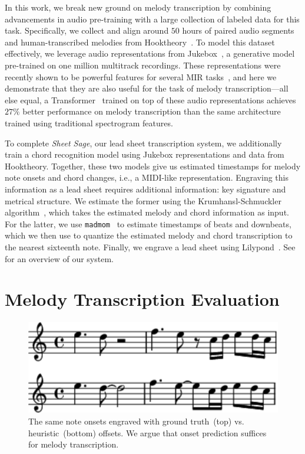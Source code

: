 \documentclass{article}
\begin{document}
In this work, we break new ground on melody transcription by combining advancements in audio pre-training with a large collection of labeled data for this task. 
Specifically, we collect and align around $50$ hours of paired audio segments and human-transcribed melodies from Hooktheory~\cite{hooktheory}. 
To model this dataset effectively, 
we leverage audio representations from Jukebox~\cite{dhariwal2020jukebox}, 
a generative model pre-trained on one million multitrack recordings. 
These representations were recently shown to be powerful features for several MIR tasks~\cite{castellon2021calm}, 
and here we demonstrate that they are also useful for the task of melody transcription---all else equal, a Transformer~\cite{vaswani2017attention} trained on top of these audio representations achieves
$27\%$ 
better performance on melody transcription 
than the same architecture trained using traditional spectrogram features.

To complete \emph{Sheet Sage}, 
our lead sheet transcription system, 
we additionally train a chord recognition model using Jukebox representations and data from Hooktheory.
Together, these two models give us estimated timestamps for melody note onsets and chord changes, i.e., a MIDI-like representation. 
Engraving this information as a lead sheet requires additional information: key signature and metrical structure. 
We estimate the former using the Krumhansl-Schmuckler algorithm~\cite{krumhansl1990cognitive,temperley1999key}, which takes the estimated melody and chord information as input. 
For the latter, we use \texttt{madmom}~\cite{bock2016madmom,bock2016joint} to estimate timestamps of beats and downbeats, 
which we then use to quantize the estimated melody and chord transcription to the nearest sixteenth note. 
Finally, we engrave a lead sheet using Lilypond~\cite{nienhuys2003lilypond}. 
See~ for an overview of our system.

\section{Melody Transcription Evaluation}

\begin{figure}[t]
    \centering
    \includegraphics[width=0.95\linewidth]{figs/heuristic_offsets.pdf}
    \caption{
The same note onsets engraved with ground truth~(top) vs. heuristic~(bottom) offsets. 
We argue that 
onset prediction suffices for melody transcription.
    }
    \label{fig:heuristic_offsets}
\end{figure}
\end{document}
